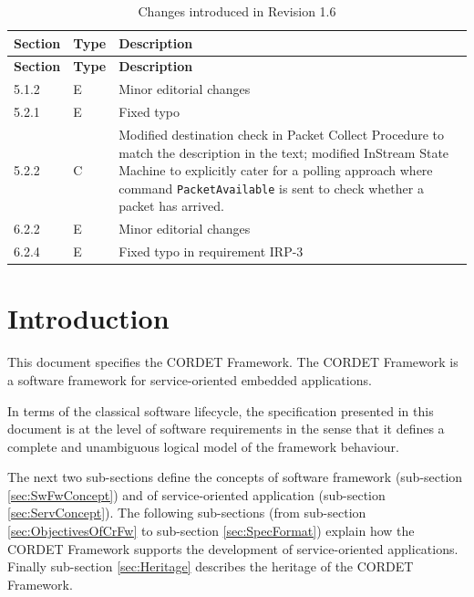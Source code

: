 \documentclass[a4paper,10pt]{article}
\newcommand{\docIssue}{1.6}						%
\let\stdsection\section
\renewcommand\section{\newpage\stdsection}
\begin{document}
\begin{longtable}{|p{1.5cm}|p{1cm}|p{8cm}|}
\caption{Changes introduced in Revision \docIssue{}}  \\
\hline
\rowcolor{light-gray}
\textbf{Section} & \textbf{Type} & \textbf{Description} \\
\hline\hline
\endfirsthead
\rowcolor{light-gray}
\textbf{Section} & \textbf{Type} & \textbf{Description} \\
\hline\hline
\endhead
5.1.2 & E & Minor editorial changes \\
\hline
5.2.1 & E & Fixed typo  \\
\hline
5.2.2 & C & Modified destination check in Packet Collect Procedure to match the description in the text; modified InStream State Machine to explicitly cater for a polling approach where command \texttt{PacketAvailable} is sent to check whether a packet has arrived. \\
\hline
6.2.2 & E & Minor editorial changes  \\
\hline
6.2.4 & E & Fixed typo in requirement IRP-3 \\
\hline
\end{longtable}

\newpage

\section{Introduction}
This document specifies the CORDET Framework. The CORDET Framework is a software framework for service-oriented embedded applications. 

In terms of the classical software lifecycle, the specification presented in this document is at the level of software requirements in the sense that it defines a complete and unambiguous logical model of the framework behaviour.

The next two sub-sections define the concepts of software framework (sub-section \ref{sec:SwFwConcept}) and of service-oriented application (sub-section \ref{sec:ServConcept}). 
The following sub-sections (from sub-section \ref{sec:ObjectivesOfCrFw} to sub-section \ref{sec:SpecFormat}) explain how the CORDET Framework supports the development of service-oriented applications. 
Finally sub-section \ref{sec:Heritage} describes the heritage of the CORDET Framework.

\end{document}
